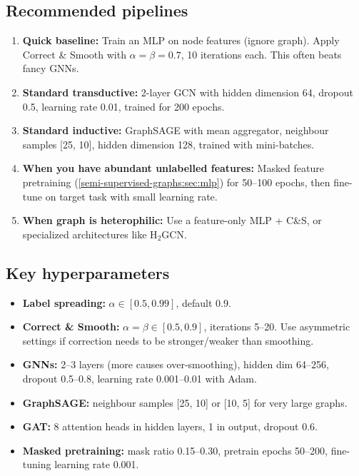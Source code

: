 \begin{notechapter}
\subsection{Recommended pipelines}

\begin{enumerate}
    \item \textbf{Quick baseline:} Train an MLP on node features (ignore graph).
          Apply Correct \& Smooth with $\alpha = \beta = 0.7$, 10 iterations
          each. This often beats fancy GNNs.

    \item \textbf{Standard transductive:} 2-layer GCN with hidden dimension 64,
          dropout 0.5, learning rate 0.01, trained for 200 epochs.

    \item \textbf{Standard inductive:} GraphSAGE with mean aggregator,
          neighbour samples [25, 10], hidden dimension 128, trained with
          mini-batches.

    \item \textbf{When you have abundant unlabelled features:} Masked feature
          pretraining (\cref{semi-supervised-graphs:sec:mlp}) for 50--100 epochs, then
          fine-tune on target task with small learning rate.

    \item \textbf{When graph is heterophilic:} Use a feature-only MLP + C\&S,
          or specialized architectures like H$_2$GCN.
\end{enumerate}

\subsection{Key hyperparameters}

\begin{itemize}
    \item \textbf{Label spreading:} $\alpha \in [0.5, 0.99]$, default 0.9.
    \item \textbf{Correct \& Smooth:} $\alpha = \beta \in [0.5, 0.9]$,
          iterations 5--20. Use asymmetric settings if correction needs to be
          stronger/weaker than smoothing.
    \item \textbf{GNNs:} 2--3 layers (more causes over-smoothing), hidden dim
          64--256, dropout 0.5--0.8, learning rate 0.001--0.01 with Adam.
    \item \textbf{GraphSAGE:} neighbour samples [25, 10] or [10, 5] for very
          large graphs.
    \item \textbf{GAT:} 8 attention heads in hidden layers, 1 in output,
          dropout 0.6.
    \item \textbf{Masked pretraining:} mask ratio 0.15--0.30,
          pretrain epochs 50--200, fine-tuning learning rate 0.001.
\end{itemize}


\end{notechapter}
